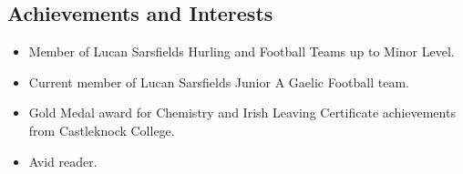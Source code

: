 \documentclass{article}
\begin{document}
\subsection*{Achievements and Interests}
\begin{small}
    \begin{itemize}
        \item Member of Lucan Sarsfields Hurling and Football Teams up to Minor Level.
        \item Current member of Lucan Sarsfields Junior A Gaelic Football team.
        \item Gold Medal award for Chemistry and Irish Leaving Certificate achievements from Castleknock College.
        \item Avid reader.
    \end{itemize}
\end{small}
\end{document}
